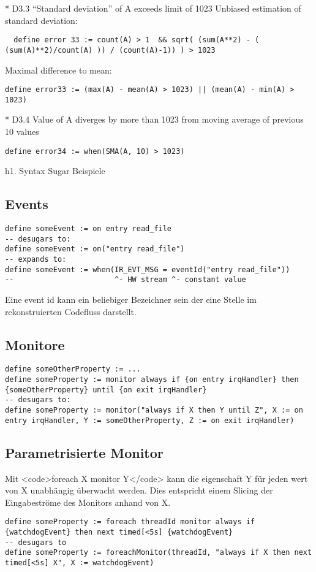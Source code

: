 * D3.3 “Standard deviation” of A exceeds limit of 1023
Unbiased estimation of standard deviation:
\begin{lstlisting}
  define error 33 := count(A) > 1  && sqrt( (sum(A**2) - ( (sum(A)**2)/count(A) )) / (count(A)-1)) ) > 1023
\end{lstlisting}
Maximal difference to mean:
\begin{lstlisting}
define error33 := (max(A) - mean(A) > 1023) || (mean(A) - min(A) > 1023)
\end{lstlisting}

* D3.4 Value of A diverges by more than 1023 from moving average of previous 10 values
\begin{lstlisting}
define error34 := when(SMA(A, 10) > 1023)
\end{lstlisting}

h1. Syntax Sugar Beispiele

\subsection{Events}

\begin{lstlisting}
define someEvent := on entry read_file
-- desugars to:
define someEvent := on("entry read_file")
-- expands to:
define someEvent := when(IR_EVT_MSG = eventId("entry read_file"))
--                       ^- HW stream ^- constant value
\end{lstlisting}

Eine event id kann ein beliebiger Bezeichner sein der eine Stelle im rekonstruierten Codefluss darstellt.

\subsection{Monitore}

\begin{lstlisting}
define someOtherProperty := ...
define someProperty := monitor always if {on entry irqHandler} then {someOtherProperty} until {on exit irqHandler}
-- desugars to:
define someProperty := monitor("always if X then Y until Z", X := on entry irqHandler, Y := someOtherProperty, Z := on exit irqHandler)
\end{lstlisting}

\subsection{Parametrisierte Monitor}

Mit <code>foreach X monitor Y</code> kann die eigenschaft Y für jeden wert von X unabhängig überwacht werden. Dies entspricht einem Slicing der Eingabeströme des Monitors anhand von X.

\begin{lstlisting}
define someProperty := foreach threadId monitor always if {watchdogEvent} then next timed[<5s] {watchdogEvent}
-- desugars to
define someProperty := foreachMonitor(threadId, "always if X then next timed[<5s] X", X := watchdogEvent)
\end{lstlisting}